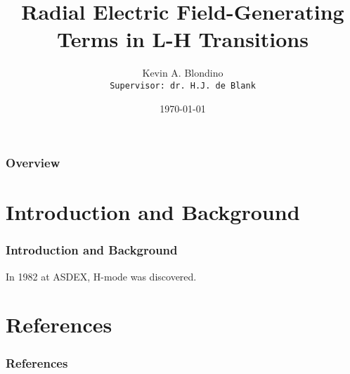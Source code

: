 \documentclass{beamer}
\author{Kevin A. Blondino \\
	\texttt{Supervisor: dr. H.J. de Blank}}
\title[$E_r$-Generating Terms in L-H Transitions]{Radial Electric Field-Generating Terms in L-H Transitions}
\institute[TUe]{Eindhoven University of Technology \\
	\medskip
	\textit{k.blondino@student.tue.nl}}
\date{\today}
\begin{document}
\begin{frame}
\titlepage
\end{frame}

\begin{frame}
\frametitle{Overview}
\tableofcontents
\end{frame}

\section{Introduction and Background}
\begin{frame}
\frametitle{Introduction and Background}
In 1982 at ASDEX, H-mode was discovered.
\end{frame}

% 
\begin{frame}
\frametitle{}
\end{frame}

\section{References}
\begin{frame}
\frametitle{References}


\end{frame}
\end{document}
